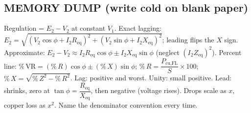 \documentclass[11pt]{article}
\begin{document}
\subsection*{\color{copper}MEMORY DUMP (write cold on blank paper)}
Regulation = $E_2 - V_2$ at constant $V_1$. Exact lagging: $E_2 = \sqrt{(V_2\cos\phi + I_2 R_{\text{eq}})^{2} + (V_2\sin\phi + I_2 X_{\text{eq}})^{2}}$; leading flips the $X$ sign. Approximate: $E_2 - V_2 \approx I_2 R_{\text{eq}}\cos\phi \pm I_2 X_{\text{eq}}\sin\phi$ (neglect $(I_2 Z_{\text{eq}})^{2}$). Percent line: $\%\,\text{VR} = (\%\,R)\cos\phi \pm (\%\,X)\sin\phi$; $\%\,R = \dfrac{P_{\text{cu,FL}}}{S} \times 100$; $\%\,X = \sqrt{\%\,Z^{2} - \%\,R^{2}}$. Lag: positive and worst. Unity: small positive. Lead: shrinks, zero at $\tan\phi = \dfrac{R_{\text{eq}}}{X_{\text{eq}}}$, then negative (voltage rises). Drops scale as $x$, copper loss as $x^{2}$. Name the denominator convention every time.
\end{document}
